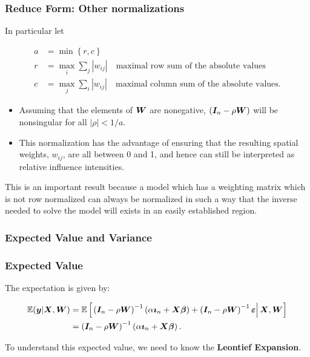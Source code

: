 \documentclass[english,10pt]{beamer}\usepackage[]{graphicx}\usepackage[]{xcolor}
\begin{document}
\begin{frame}
  \frametitle{Reduce Form: Other normalizations}
  In particular let

\begin{equation}
  \begin{aligned}
    a & = \min \left\lbrace r, c \right\rbrace \\
    r & = \max_i \sum_j \left|w_{ij}\right|\quad \mbox{maximal row sum of the absolute values} \\
    c & = \max_j \sum_i \left|w_{ij}\right|\quad \mbox{maximal column sum of the absolute values}.
  \end{aligned}
\end{equation}
\begin{itemize}
  \item Assuming that the elements of $\bm W$ are nonegative, $(\bm I_n - \rho\bm W)$ will be nonsingular for all $\left|\rho\right| < 1/a$.
  \item This normalization has the advantage of ensuring that the resulting spatial weights, $w_{ij}$, are all between 0 and 1, and hence can still be interpreted as relative influence intensities.
\end{itemize}

\begin{alertblock}{}
This is an important result because a model which has a weighting matrix which is not row normalized can always be normalized in such a way that the inverse needed to solve the model will exists in an easily established region. 
\end{alertblock}
\end{frame}


\subsubsection{Expected Value and Variance}

\begin{frame}
  \frametitle{Expected Value}
    The expectation is given by:

\begin{equation}\label{eq:expected_value_slm}
  \begin{aligned}
\mathbb{E}(\bm y|\bm X,\bm W) & = \mathbb{E}\left[\left.\left(\bm I_n - \rho \bm W\right)^{-1}\left(\alpha \bm\imath_n + \bm X\bm \beta\right) + \left(\bm I_n - \rho \bm W\right)^{-1}\bm {\varepsilon}\right|\bm X,\bm W\right] \\
                & = \left(\bm I_n - \rho \bm W\right)^{-1}\left(\alpha \bm\imath_n + \bm X\bm \beta\right).
\end{aligned}
\end{equation}

To understand this expected value, we need to know the \textbf{Leontief Expansion}.
\end{frame}
\end{document}
